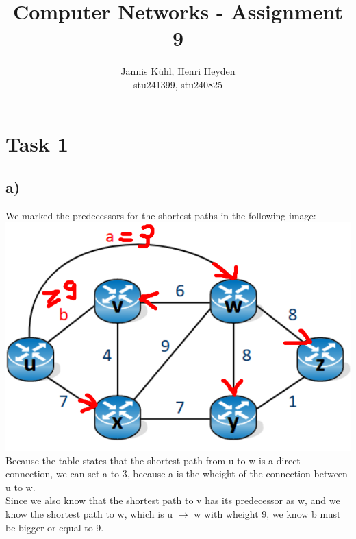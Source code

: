 \documentclass[12pt, a4paper]{article}
\title{Computer Networks - Assignment 9}
\author{Jannis Kühl, Henri Heyden\\ \small stu241399, stu240825}
\date{}
\begin{document}
\maketitle
\section*{Task 1}
\subsection*{a)}
We marked the predecessors for the shortest paths in the following image:
\includegraphics[width=\textwidth]{A1.png}
Because the table states that the shortest path from u to w is a direct connection, we can set a to 3, because a is the wheight of the connection between u to w. \\
Since we also know that the shortest path to v has its predecessor as w, and we know the shortest path to w, which is u \(\rightarrow\) w with wheight 9, we know b must be bigger or equal to 9. \pagebreak
\end{document}
